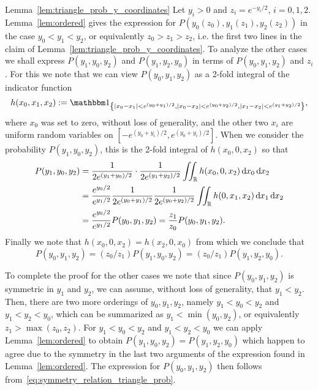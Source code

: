 \begin{proofof}{Lemma~\ref{lem:triangle_prob_y_coordinates}}
Let $y_i >0$ and $z_i = e^{-y_i/2}$, $i=0,1,2$. Lemma~\ref{lem:ordered} gives the expression for $P(y_0(z_0),y_1(z_1),y_2(z_2))$ in the case $y_0<y_1<y_2$, or equivalently $z_0>z_1>z_2$, i.e. the first two lines in the claim of Lemma~\ref{lem:triangle_prob_y_coordinates}. To analyze the other cases we shall express $P(y_1,y_0,y_2)$ and $P(y_1,y_2,y_0)$ in terms of $P(y_0,y_1,y_2)$ and $z_i$. For this we note that we can view $P(y_0,y_1,y_2)$ as a 2-fold integral of the indicator function
\[ 
	h(x_0, x_1, x_2) := \ind{ |x_0 - x_1| < e^{(y_0+y_1)/2}, |x_0 - x_2| < e^{(y_0+y_2)/2}, |x_1-x_2| < e^{(y_1+y_2)/2}}, 
\]
where $x_0$ was set to zero, without loss of generality, and the other two $x_i$ are uniform random variables on $[-e^{(y_0+y_i)/2}, e^{(y_0+y_i)/2}]$. When we consider the probability $P(y_1,y_0,y_2)$, this is the 2-fold integral of $h(x_0,0,x_2)$ so that
\begin{align*}
	P(y_1,y_0,y_2) &= \frac{1}{2e^{(y_1+y_0)/2}} \cdot \frac{1}{2e^{(y_1+y_2)/2}} 
		\iint_{{\mathbb R}} h(x_0,0,x_2) \operatorname{\mathrm{d}\hspace{-2pt}} x_0 \operatorname{\mathrm{d}\hspace{-2pt}} x_2\\
	&= \frac{e^{y_0/2}}{e^{y_1/2}} \frac{1}{2e^{(y_0+y_1)/2}} \frac{1}{2e^{(y_0+y_2)/2}} 
		\iint_{{\mathbb R}} h(0,x_1,x_2) \operatorname{\mathrm{d}\hspace{-2pt}} x_1 \operatorname{\mathrm{d}\hspace{-2pt}} x_2\\
	&= \frac{e^{y_0/2}}{e^{y_1/2}} P(y_0,y_1,y_2) = \frac{z_1}{z_0}  P(y_0,y_1,y_2).
\end{align*}
Finally we note that $h(x_0,0,x_2) = h(x_2,0,x_0)$ from which we conclude that
\begin{equation}\label{eq:symmetry_relation_triangle_prob}
	P(y_0, y_1, y_2) = \left(z_0/z_1\right) P(y_1,y_0,y_2) = \left(z_0/z_1\right) P(y_1,y_2,y_0).
\end{equation}

To complete the proof for the other cases we note that since $P(y_0,y_1,y_2)$ is symmetric in $y_1$ and $y_2$, we can assume, without loss of generality, that $y_1 < y_2$. Then, there are two more orderings of $y_0, y_1, y_2$, namely $y_1< y_0< y_2$ and $y_1<y_2<y_0$, which can be summarized as $y_1 < \min (y_0,y_2)$, or equivalently $z_1 > \max(z_0,z_2)$. For $y_1 < y_0 < y_2$ and $y_1 < y_2<y_0$ we can apply Lemma~\ref{lem:ordered} to obtain $P(y_1,y_0,y_2) = P(y_1,y_2,y_0)$ which happen to agree due to the symmetry in the last two arguments of the expression found in Lemma~\ref{lem:ordered}. The expression for $P(y_0,y_1,y_2)$ then follows from~\eqref{eq:symmetry_relation_triangle_prob}.
\end{proofof}

